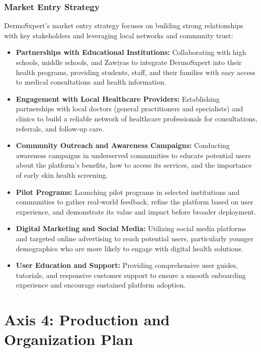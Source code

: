 \subsection{Market Entry Strategy}
DermoSxpert's market entry strategy focuses on building strong relationships with key stakeholders and leveraging local networks and community trust:
\begin{itemize}
  \item \textbf{Partnerships with Educational Institutions:} Collaborating with high schools, middle schools, and Zawiyas to integrate DermoSxpert into their health programs, providing students, staff, and their families with easy access to medical consultations and health information.
  \item \textbf{Engagement with Local Healthcare Providers:} Establishing partnerships with local doctors (general practitioners and specialists) and clinics to build a reliable network of healthcare professionals for consultations, referrals, and follow-up care.
  \item \textbf{Community Outreach and Awareness Campaigns:} Conducting awareness campaigns in underserved communities to educate potential users about the platform's benefits, how to access its services, and the importance of early skin health screening.
  \item \textbf{Pilot Programs:} Launching pilot programs in selected institutions and communities to gather real-world feedback, refine the platform based on user experience, and demonstrate its value and impact before broader deployment.
  \item \textbf{Digital Marketing and Social Media:} Utilizing social media platforms and targeted online advertising to reach potential users, particularly younger demographics who are more likely to engage with digital health solutions.
  \item \textbf{User Education and Support:} Providing comprehensive user guides, tutorials, and responsive customer support to ensure a smooth onboarding experience and encourage sustained platform adoption.
\end{itemize}

\chapter{Axis 4: Production and Organization Plan}

